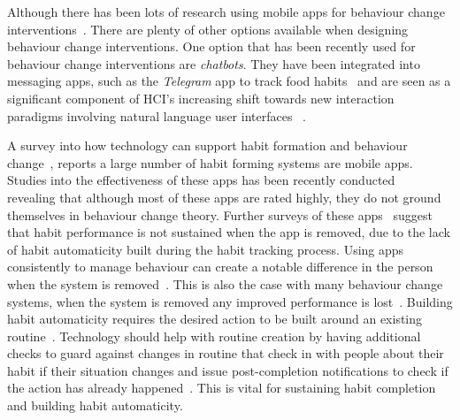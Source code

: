 \documentclass{scaffold/sigchi}
\begin{document}
Although there has been lots of research using mobile apps for behaviour change interventions~\cite{survey_on_current_apps_of_steel}. There are plenty of other options available when designing behaviour change interventions. One option that has been recently used for behaviour change interventions are \textit{chatbots}. They have been integrated into messaging apps, such as the \textit{Telegram} app to track food habits~\cite{telegram_bot_tracking_habits} and are seen as a significant component of HCI's increasing shift towards new interaction paradigms involving natural language user interfaces%
~\cite{chatbots_and_new_world_of_hci}.

A survey into how technology can support habit formation and behaviour change~\cite{survey_on_current_apps_of_steel}, reports a large number of habit forming systems are mobile apps. Studies into the effectiveness of these apps has been recently conducted~\cite{article_beyond_self_tracking_designing_apps, article_dont_kick_habit} revealing that although most of these apps are rated highly, they do not ground themselves in behaviour change theory. Further surveys of these apps~\cite{survey_on_apps_2} suggest that habit performance is not sustained when the app is removed, due to the lack of habit automaticity built during the habit tracking process. Using apps consistently to manage behaviour can create a notable difference in the person when the system is removed~\cite{article_my_phone_is_part_of_my_soul}.
This is also the case with many behaviour change systems, when the system is removed any improved performance is lost~\cite{article_dont_kick_habit,article_realtime_feedback_improving_medication_taking}. Building habit automaticity requires the desired action to be built around an existing routine~\cite{article_how_habits_formed_modelling_habit_formation, article_implementation_intentions_multicue}. Technology should help with routine creation by having additional checks to guard against changes in routine that check in with people about their habit if their situation changes and issue post-completion notifications to check if the action has already happened~\cite{article_dont_forget_your_pill}. This is vital for sustaining habit completion and building habit automaticity.
\end{document}
